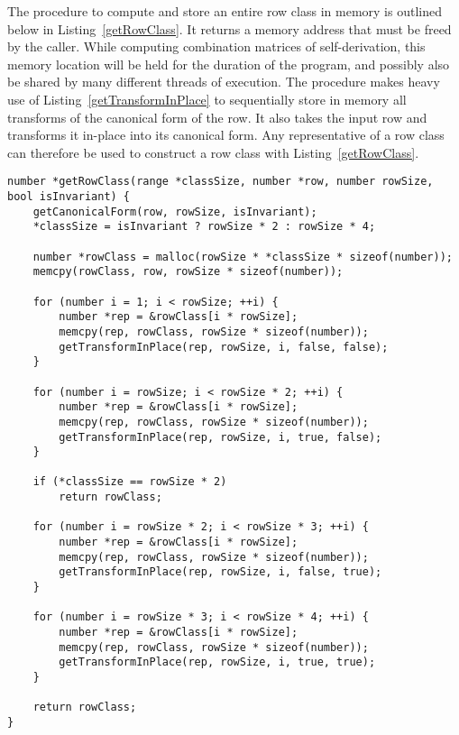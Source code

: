 The procedure to compute and store an entire row class in memory is outlined below in Listing~\ref{getRowClass}. It returns a memory address that must be freed by the caller. While computing combination matrices of self-derivation, this memory location will be held for the duration of the program, and possibly also be shared by many different threads of execution. The procedure makes heavy use of Listing~\ref{getTransformInPlace} to sequentially store in memory all transforms of the canonical form of the row. It also takes the input row and transforms it in-place into its canonical form. Any representative of a row class can therefore be used to construct a row class with Listing~\ref{getRowClass}.

\begin{lstlisting}[caption={Computing and storing a row class in memory.},label={getRowClass}]
number *getRowClass(range *classSize, number *row, number rowSize, bool isInvariant) {
    getCanonicalForm(row, rowSize, isInvariant);
    *classSize = isInvariant ? rowSize * 2 : rowSize * 4;

    number *rowClass = malloc(rowSize * *classSize * sizeof(number));
    memcpy(rowClass, row, rowSize * sizeof(number));

    for (number i = 1; i < rowSize; ++i) {
        number *rep = &rowClass[i * rowSize];
        memcpy(rep, rowClass, rowSize * sizeof(number));
        getTransformInPlace(rep, rowSize, i, false, false);
    }

    for (number i = rowSize; i < rowSize * 2; ++i) {
        number *rep = &rowClass[i * rowSize];
        memcpy(rep, rowClass, rowSize * sizeof(number));
        getTransformInPlace(rep, rowSize, i, true, false);
    }

    if (*classSize == rowSize * 2)
        return rowClass;

    for (number i = rowSize * 2; i < rowSize * 3; ++i) {
        number *rep = &rowClass[i * rowSize];
        memcpy(rep, rowClass, rowSize * sizeof(number));
        getTransformInPlace(rep, rowSize, i, false, true);
    }

    for (number i = rowSize * 3; i < rowSize * 4; ++i) {
        number *rep = &rowClass[i * rowSize];
        memcpy(rep, rowClass, rowSize * sizeof(number));
        getTransformInPlace(rep, rowSize, i, true, true);
    }

    return rowClass;
}
\end{lstlisting}

